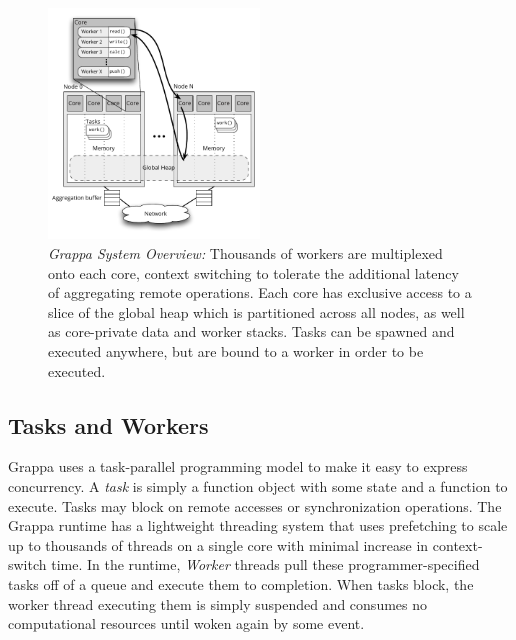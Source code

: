 \begin{figure}[t]
  \centering
  \includegraphics[width=0.5\textwidth]{figs/grappa_system.pdf}
  \caption{\emph{Grappa System Overview:}
    Thousands of workers are multiplexed onto each core, context switching to tolerate the additional latency of aggregating remote operations. Each core has exclusive access to a slice of the global heap which is partitioned across all nodes, as well as core-private data and worker stacks. Tasks can be spawned and executed anywhere, but are bound to a worker in order to be executed.
  }
  \label{fig:system}
\end{figure}

\subsection{Tasks and Workers}
Grappa uses a task-parallel programming model to make it easy to express concurrency.
A \emph{task} is simply a function object with some state and a function to execute.
Tasks may block on remote accesses or synchronization operations.
The Grappa runtime has a lightweight threading system that uses prefetching to scale up to thousands of threads on a single core with minimal increase in context-switch time.
In the runtime, \emph{Worker} threads pull these programmer-specified tasks off of a queue and execute them to completion. When tasks block, the worker thread executing them is simply suspended and consumes no computational resources until woken again by some event.

